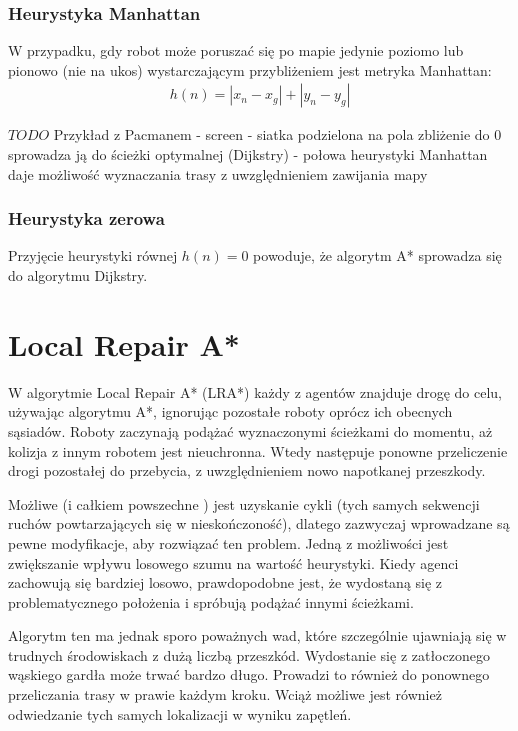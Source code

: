 \subsubsection{Heurystyka Manhattan}
W przypadku, gdy robot może poruszać się po mapie jedynie poziomo lub pionowo (nie na ukos) wystarczającym przybliżeniem jest metryka Manhattan:
\begin{gather}
 	h(n) = |x_n - x_g| + |y_n - y_g|
 	\label{eq_astar_heu_man} 
\end{gather}

$TODO$ Przykład z Pacmanem - screen - siatka podzielona na pola
zbliżenie do 0 sprowadza ją do ścieżki optymalnej (Dijkstry) - połowa heurystyki Manhattan daje możliwość wyznaczania trasy z uwzględnieniem zawijania mapy

\subsubsection{Heurystyka zerowa}
Przyjęcie heurystyki równej $h(n) = 0$ powoduje, że algorytm A* sprowadza się do algorytmu Dijkstry.

\section{Local Repair A*}
W algorytmie Local Repair A* (LRA*) każdy z agentów znajduje drogę do celu, używając algorytmu A*, ignorując pozostałe roboty oprócz ich obecnych sąsiadów. Roboty zaczynają podążać wyznaczonymi ścieżkami do momentu, aż kolizja z innym robotem jest nieuchronna. Wtedy następuje ponowne przeliczenie drogi pozostałej do przebycia, z uwzględnieniem nowo napotkanej przeszkody.

Możliwe (i całkiem powszechne \cite{cooppath}) jest uzyskanie cykli (tych samych sekwencji ruchów powtarzających się w nieskończoność), dlatego zazwyczaj wprowadzane są pewne modyfikacje, aby rozwiązać ten problem. Jedną z możliwości jest zwiększanie wpływu losowego szumu na wartość heurystyki. Kiedy agenci zachowują się bardziej losowo, prawdopodobne jest, że wydostaną się z problematycznego położenia i spróbują podążać innymi ścieżkami.

Algorytm ten ma jednak sporo poważnych wad, które szczególnie ujawniają się w trudnych środowiskach z dużą liczbą przeszkód. Wydostanie się z zatłoczonego wąskiego gardła może trwać bardzo długo. Prowadzi to również do ponownego przeliczania trasy w prawie każdym kroku. Wciąż możliwe jest również odwiedzanie tych samych lokalizacji w wyniku zapętleń.

